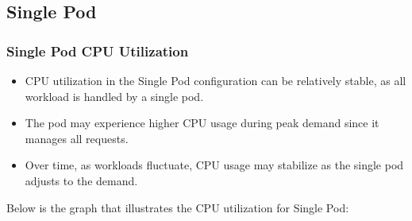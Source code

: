 \subsection{Single Pod}
\subsubsection{Single Pod CPU Utilization}
\begin{itemize}
    \item CPU utilization in the Single Pod configuration can be relatively stable, as all workload is handled by a single pod.
    \item The pod may experience higher CPU usage during peak demand since it manages all requests.
    \item Over time, as workloads fluctuate, CPU usage may stabilize as the single pod adjusts to the demand.
\end{itemize}

\noindent Below is the graph that illustrates the CPU utilization for Single Pod:

